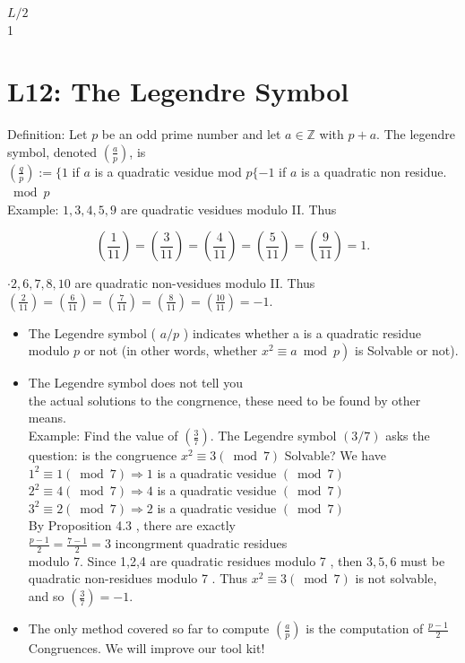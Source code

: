 \documentclass[10pt]{article}
\begin{document}
$L / 2$\\
1

\section*{L12: The Legendre Symbol}
Definition: Let $p$ be an odd prime number and let $a \in \mathbb{Z}$ with $p+a$. The legendre symbol, denoted $\left(\frac{a}{p}\right)$, is\\
$\left(\frac{q}{p}\right):=\{1$ if $a$ is a quadratic vesidue mod $p \{-1$ if $a$ is a quadratic non residue. $\bmod p$\\
Example: $1,3,4,5,9$ are quadratic vesidues modulo II. Thus

$$
\left(\frac{1}{11}\right)=\left(\frac{3}{11}\right)=\left(\frac{4}{11}\right)=\left(\frac{5}{11}\right)=\left(\frac{9}{11}\right)=1 .
$$

$\cdot 2,6,7,8,10$ are quadratic non-vesidues modulo II. Thus $\left(\frac{2}{11}\right)=\left(\frac{6}{11}\right)=\left(\frac{7}{11}\right)=\left(\frac{8}{11}\right)=\left(\frac{10}{11}\right)=-1$.

\begin{itemize}
  \item The Legendre symbol ( $a / p$ ) indicates whether a is a quadratic residue modulo $p$ or not (in other words, whether $\left.x^{2} \equiv a \bmod p\right)$ is Solvable or not).
  \item The Legendre symbol does not tell you\\
the actual solutions to the congrnence, these need to be found by other means.\\
Example: Find the value of $\left(\frac{3}{7}\right)$. The Legendre symbol $(3 / 7)$ asks the question: is the congruence $x^{2} \equiv 3(\bmod 7)$ Solvable? We have\\
$1^{2} \equiv 1(\bmod 7) \Rightarrow 1$ is a quadratic vesidue $(\bmod 7)$\\
$2^{2} \equiv 4(\bmod 7) \Rightarrow 4$ is a quadratic vesidue $(\bmod 7)$\\
$3^{2} \equiv 2(\bmod 7) \Rightarrow 2$ is a quadratic vesidue $(\bmod 7)$\\
By Proposition 4.3 , there are exactly\\
$\frac{p-1}{2}=\frac{7-1}{2}=3$ incongrment quadratic residues\\
modulo 7. Since 1,2,4 are quadratic residues modulo 7 , then $3,5,6$ must be quadratic non-residues modulo 7 . Thus $x^{2} \equiv 3(\bmod 7)$ is not solvable, and so $\left(\frac{3}{7}\right)=-1$.
  \item The only method covered so far to compute $\left(\frac{a}{p}\right)$ is the computation of $\frac{p-1}{2}$ Congruences. We will improve our tool kit!
\end{itemize}
\end{document}
